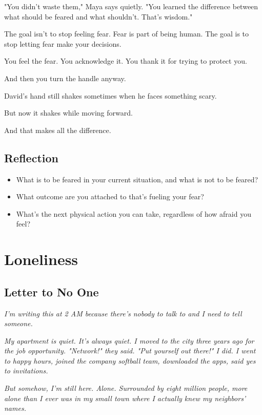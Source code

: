 \documentclass[11pt,twoside]{book}
\begin{document}
"You didn't waste them," Maya says quietly. "You learned the difference between what should be feared and what shouldn't. That's wisdom."

The goal isn't to stop feeling fear. Fear is part of being human. The goal is to stop letting fear make your decisions.

You feel the fear. You acknowledge it. You thank it for trying to protect you.

And then you turn the handle anyway.

David's hand still shakes sometimes when he faces something scary.

But now it shakes while moving forward.

And that makes all the difference.

\section*{Reflection}

\begin{itemize}
\item What is to be feared in your current situation, and what is not to be feared?
\item What outcome are you attached to that's fueling your fear?
\item What's the next physical action you can take, regardless of how afraid you feel?
\end{itemize}

\chapter{Loneliness}

\section*{Letter to No One}

\textit{I'm writing this at 2 AM because there's nobody to talk to and I need to tell someone.}

\textit{My apartment is quiet. It's always quiet. I moved to the city three years ago for the job opportunity. "Network!" they said. "Put yourself out there!" I did. I went to happy hours, joined the company softball team, downloaded the apps, said yes to invitations.}

\textit{But somehow, I'm still here. Alone. Surrounded by eight million people, more alone than I ever was in my small town where I actually knew my neighbors' names.}
\end{document}
